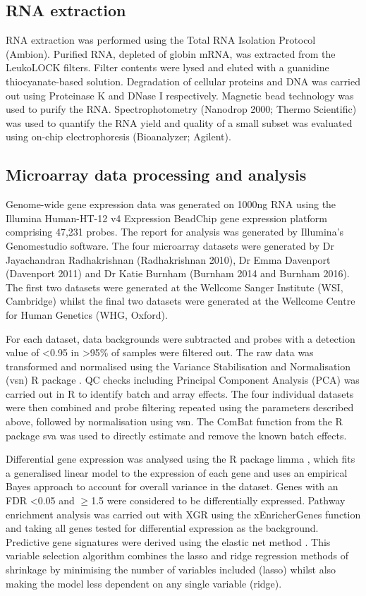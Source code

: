\subsection{RNA extraction}
RNA extraction was performed using the Total RNA Isolation Protocol (Ambion). Purified RNA, depleted of globin mRNA, was extracted from the LeukoLOCK filters. Filter contents were lysed and eluted with a guanidine thiocyanate-based solution. Degradation of cellular proteins and DNA was carried out using Proteinase K and DNase I respectively. Magnetic bead technology was used to purify the RNA. Spectrophotometry (Nanodrop 2000; Thermo Scientific) was used to quantify the RNA yield and quality of a small subset was evaluated using on-chip electrophoresis (Bioanalyzer; Agilent).

\subsection{Microarray data processing and analysis}
Genome-wide gene expression data was generated on 1000ng RNA using the Illumina Human-HT-12 v4 Expression BeadChip gene expression platform comprising 47,231 probes. The report for analysis was generated by Illumina's Genomestudio software. The four microarray datasets were generated by Dr Jayachandran Radhakrishnan (Radhakrishnan 2010), Dr Emma Davenport (Davenport 2011) and Dr Katie Burnham (Burnham 2014 and Burnham 2016). The first two datasets were generated at the Wellcome Sanger Institute (WSI, Cambridge) whilst the final two datasets were generated at the Wellcome Centre for Human Genetics (WHG, Oxford).

For each dataset, data backgrounds were subtracted and probes with a detection value of \textless 0.95  in \textgreater 95\% of samples were filtered out. The raw data was transformed and normalised using the Variance Stabilisation and Normalisation (vsn) R package \parencite{Huber2002}. QC checks including Principal Component Analysis (PCA) was carried out in R to identify batch and array effects. The four individual datasets were then combined and probe filtering repeated using the parameters described above, followed by normalisation using vsn. The ComBat function from the R package sva \parencite{Leek2012} was used to directly estimate and remove the known batch effects. 

Differential gene expression was analysed using the R package limma \parencite{Ritchie2015}, which fits a generalised linear model to the expression of each gene and uses an empirical Bayes approach to account for overall variance in the dataset. Genes with an FDR \textless 0.05 and $\geq$1.5 were considered to be differentially expressed. Pathway enrichment analysis was carried out with XGR \parencite{Fang2016} using the xEnricherGenes function and taking all genes tested for differential expression as the background. Predictive gene signatures were derived using the elastic net method \parencite{Zou2005} \parencite{Herberg2016}. This variable selection algorithm combines the lasso and ridge regression methods of shrinkage by minimising the number of variables included (lasso) whilst also making the model less dependent on any single variable (ridge).

